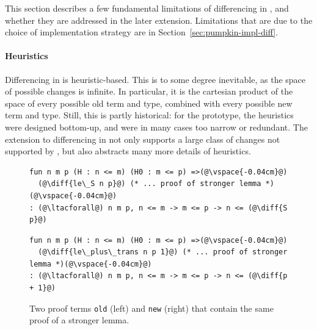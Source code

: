 This section describes a few fundamental limitations of differencing in \sysname,
and whether they are addressed in the later \toolnamec extension.
Limitations that are due to the choice of implementation strategy are in Section~\ref{sec:pumpkin-impl-diff}.

\paragraph{Heuristics}
Differencing in \sysname is heuristic-based.
This is to some degree inevitable, as the space of possible changes is infinite.
In particular, it is the cartesian product of the space of every possible old term and type,
combined with every possible new term and type.
Still, this is partly historical: for the \sysname prototype, the heuristics were designed bottom-up, and were in many cases too narrow or redundant.
The extension to differencing in \toolnamec not only supports a large class of changes not supported by \sysname,
but also abstracts many more details of heuristics.

\begin{figure}[ht]
\begin{minipage}{0.48\textwidth}
\begin{lstlisting}[language=coq]
fun n m p (H : n <= m) (H0 : m <= p) =>(@\vspace{-0.04cm}@)
  (@\diff{le\_S n p}@) (* ... proof of stronger lemma *)(@\vspace{-0.04cm}@)
: (@\ltacforall@) n m p, n <= m -> m <= p -> n <= (@\diff{S p}@)
\end{lstlisting}
\end{minipage}
\hfill
\begin{minipage}{0.48\textwidth}
\begin{lstlisting}[language=coq]
fun n m p (H : n <= m) (H0 : m <= p) =>(@\vspace{-0.04cm}@)
  (@\diff{le\_plus\_trans n p 1}@) (* ... proof of stronger lemma *)(@\vspace{-0.04cm}@)
: (@\ltacforall@) n m p, n <= m -> m <= p -> n <= (@\diff{p + 1}@)
\end{lstlisting}
\end{minipage}
\vspace{-.35cm}
\caption{Two proof terms \lstinline{old} (left) and \lstinline{new} (right) that contain the same proof of a stronger lemma.}
\label{fig:stronger}
\end{figure}

